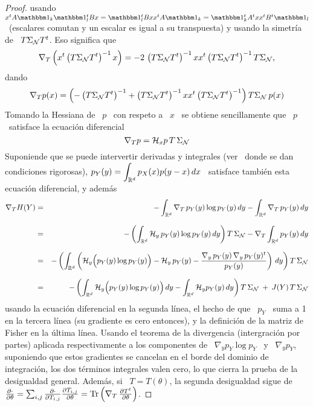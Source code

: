 \begin{proof}
  usando \ $x^t  A \un_k \un_l^t B x =  \un_l^t B x x^t A \un_k  = \un_k^t A^t x
  x^t B^t \un_l$ \ (escalares comutan y  un escalar es igual a su transpuesta) y
  usando la simetr\'ia de \ $T \Sigma_{\mathcal{N}} T^t$.  Eso significa que
  \[
  \nabla_T \left( x^t \left( T \Sigma_{\mathcal{N}} T^t \right)^{-1} x \right) = - 2 \,
  \left(  T \Sigma_{\mathcal{N}}  T^t \right)^{-1}  x  x^t \left(  T \Sigma_{\mathcal{N}}  T^t
  \right)^{-1} T \Sigma_{\mathcal{N}},
  \]
  dando
  \[
  \nabla_T p(x)  = \left( - \left(  T \Sigma_{\mathcal{N}} T^t \right)^{-1}  + \left( T
      \Sigma_{\mathcal{N}}  T^t   \right)^{-1}  x   x^t  \left(  T   \Sigma_{\mathcal{N}}  T^t
    \right)^{-1} \right) T \Sigma_{\mathcal{N}} \, p(x)
  \]
  Tomando la Hessiana de \ $p$ \  con respeto a \ $x$ \ se obtiene sencillamente
  que \ $p$ \ satisface la ecuaci\'on diferencial
  \[
  \nabla_T p = \mathcal{H}_x p \, T \, \Sigma_{\mathcal{N}}
  \]
  Suponiende que  se puede intervertir derivadas  y integrales (ver~\cite{Bar84,
    Bar86}  donde  se  dan   condiciones  rigorosas),  $\displaystyle  p_Y(y)  =
  \int_{\mathbb{R}^d}  p_X(x) p(y-x)  \, dx$  \ satisface  tambi\'en  esta ecuaci\'on
  diferencial, y adem\'as
  \begin{eqnarray*}
  \nabla_T H(Y) & = & - \int_{\mathbb{R}^d} \nabla_T \, p_Y(y) \log p_Y(y)
  \, dy - \int_{\mathbb{R}^d} \nabla_T \, p_Y(y) \, dy\\[2.5mm]
  & = & - \left( \int_{\mathbb{R}^d} \mathcal{H}_y \, p_Y(y) \log p_Y(y) \, dy \right) T \,
  \Sigma_{\mathcal{N}} - \nabla_T \int_{\mathbb{R}^d} p_Y(y) \, dy\\[2.5mm]
  & = & - \left( \int_{\mathbb{R}^d} \left( \mathcal{H}_y \Big( p_Y(y) \log p_Y(y) \Big) -
  \mathcal{H}_y \, p_Y(y) - \frac{\nabla_y \, p_Y(y) \, \nabla_y \, p_Y(y)^t}{p_Y(y)}
  \right) \, dy \right) T \, \Sigma_{\mathcal{N}}\\[2.5mm]
  & = & - \left( \int_{\mathbb{R}^d} \mathcal{H}_y \Big( p_Y(y) \log p_Y(y) \Big) \, dy -
  \int_{\mathbb{R}^d} \mathcal{H}_y p_Y(y) \, dy \right) T \, \Sigma_{\mathcal{N}} \: + \: J(Y) \, T
  \, \Sigma_{\mathcal{N}}
  \end{eqnarray*}
  usando la  ecuaci\'on diferencial  en la  segunda l\'inea, el  hecho de  que \
  $p_Y$ \ suma a  1 en la tercera l\'inea (su gradiente  es cero entonces), y la
  definici\'on de la matriz de Fisher  en la \'ultima l\'inea. Usando el teorema
  de la  divergencia (intergraci\'on por partes) aplicada  respectivamente a los
  componentes de \ $\nabla_y p_Y \log  p_Y$ \ y \ $\nabla_y p_Y$, suponiendo que
  estos gradientes se cancelan en el borde del dominio de integraci\'on, los dos
  t\'erminos integrales  valen cero, lo que  cierra la prueba  de la desigualdad
  general.  Adem\'as,  si \ $T =  T(\theta)$, la segunda desigualdad  sigue de \
  $\frac{\partial   \cdot}{\partial    \theta}   =   \sum_{i,j}   \frac{\partial
    \cdot}{\partial   T_{i,j}}   \frac{\partial   T_{i,j}}{\partial  \theta}   =
  \operatorname{Tr}\left( \nabla_T \, \frac{\partial T^t}{\partial \theta} \right)$.
\end{proof}

